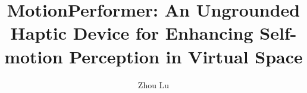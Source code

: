 \documentclass[12pt,a4paper,final]{report}	%
\title{MotionPerformer: An Ungrounded Haptic Device for Enhancing Self-motion Perception in Virtual Space}
\author{Zhou Lu}
\begin{document}
\def\chaptermark#1{\markboth{#1}{ }}%
%
%
\titlepage
\comemberspage
\firstabstract
%
%
\toc
\ifPROPOSAL
\else
   \newpage
   \listoffigures
   \acknowledgements
   \acknowledgementstext
\fi

\newpage
{}
\def\chaptermark#1{\markboth{\thechapter.\ #1}{ }}%

%
%








%
%
%
%
%
%
%
%
%
\def\chaptermark#1{\markboth{#1}{ }}%


\newpage


%
%

%
%



%
\ifCHICAGO
   
\else
   
\fi
%
%
%
\appendix
\def\chaptermark#1{\markboth{\thechapter.\ #1}{ }}%
%

%
\end{document}
